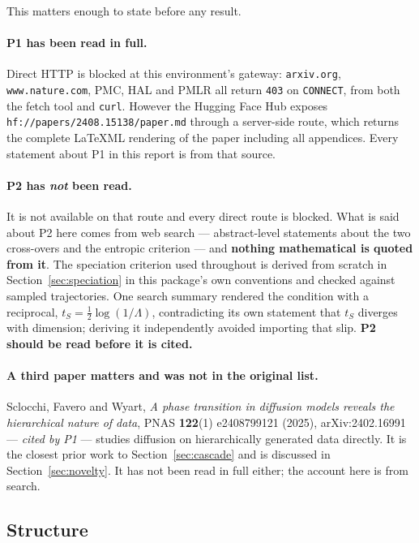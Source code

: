 \documentclass[11pt]{article}
\theoremstyle{remark}
\newcommand{\code}[1]{\texttt{\small #1}}
\begin{document}
This matters enough to state before any result.

\paragraph{P1 has been read in full.} Direct HTTP is blocked at this
environment's gateway: \code{arxiv.org}, \code{www.nature.com}, PMC, HAL and
PMLR all return \code{403} on \code{CONNECT}, from both the fetch tool and
\code{curl}. However the Hugging Face Hub exposes
\code{hf://papers/2408.15138/paper.md} through a server-side route, which
returns the complete \LaTeX ML rendering of the paper including all appendices.
Every statement about P1 in this report is from that source.

\paragraph{P2 has \emph{not} been read.} It is not available on that route and
every direct route is blocked. What is said about P2 here comes from web search
--- abstract-level statements about the two cross-overs and the entropic
criterion --- and \textbf{nothing mathematical is quoted from it}. The
speciation criterion used throughout is derived from scratch in
Section~\ref{sec:speciation} in this package's own conventions and checked
against sampled trajectories. One search summary rendered the condition with a
reciprocal, $t_S = \tfrac12\log(1/\Lambda)$, contradicting its own statement
that $t_S$ diverges with dimension; deriving it independently avoided importing
that slip. \textbf{P2 should be read before it is cited.}

\paragraph{A third paper matters and was not in the original list.}
Sclocchi, Favero and Wyart, \emph{A phase transition in diffusion models reveals
the hierarchical nature of data}, PNAS \textbf{122}(1) e2408799121 (2025),
arXiv:2402.16991 --- \emph{cited by P1} --- studies diffusion on hierarchically
generated data directly. It is the closest prior work to Section~\ref{sec:cascade}
and is discussed in Section~\ref{sec:novelty}. It has not been read in full
either; the account here is from search.

\subsection{Structure}
\end{document}
